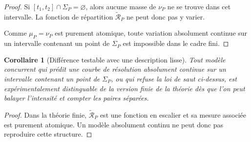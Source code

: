 \documentclass[11pt,a4paper,openany]{book}
\newtheorem{corollary}[definition]{Corollaire}
\begin{document}
\begin{proof}
Si \([t_1,t_2]\cap\Sigma_P=\varnothing\), alors aucune masse de \(\nu_P\) ne se trouve dans cet intervalle. La fonction de répartition \(\widetilde{\mathcal R}_P\) ne peut donc pas y varier.

Comme \(\mu_P=\nu_P\) est purement atomique, toute variation absolument continue sur un intervalle contenant un point de \(\Sigma_P\) est impossible dans le cadre fini.
\end{proof}

\begin{corollary}[Différence testable avec une description lisse]
Tout modèle concurrent qui prédit une courbe de résolution absolument continue sur un intervalle contenant un point de \(\Sigma_P\), ou qui refuse la loi de saut ci-dessus, est expérimentalement distinguable de la version finie de la théorie dès que l'on peut balayer l'intensité et compter les paires séparées.
\end{corollary}

\begin{proof}
Dans la théorie finie, \(\widetilde{\mathcal R}_P\) est une fonction en escalier et sa mesure associée est purement atomique. Un modèle absolument continu ne peut donc pas reproduire cette structure.
\end{proof}
\end{document}
